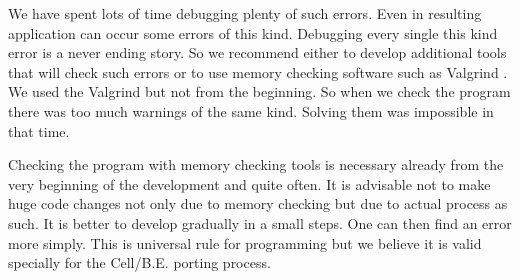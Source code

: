\par
We have spent lots of time debugging plenty of such errors.
Even in resulting application can occur some errors of this kind.
Debugging every single this kind error is a never ending story.
So we recommend either to develop additional tools that will check such errors or to use memory checking software such as Valgrind \cite{valgrind}.
We used the Valgrind but not from the beginning.
So when we check the program there was too much warnings of the same kind.
Solving them was impossible in that time.

\par
Checking the program with memory checking tools is necessary already from the very beginning of the development and quite often.
It is advisable not to make huge code changes not only due to memory checking but due to actual process as such.
It is better to develop gradually in a small steps.
One can then find an error more simply.
This is universal rule for programming but we believe it is valid specially for the \mbox{Cell/B.E.} porting process.
